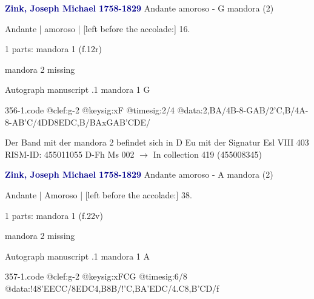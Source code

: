 \documentclass[twocolumn]{book}
\begin{document}
\newline \par \vspace{7pt} \textcolor{darkblue}{\textbf{Zink, Joseph Michael  1758-1829}}
\newline Andante amoroso - G
\newline mandora (2)
\newline \begin{itshape}[f.12r, at left:] Andante | amoroso | [left before the accolade:] 16.\end{itshape} 
\newline \textcolor{darkblue}{}  1 parts: mandora 1  (f.12r)
\newline \begin{small} mandora 2 missing\end{small} 
\newline Autograph manuscript
.1  mandora 1  G  
\begin{filecontents*}{356-1.code}
@clef:g-2
@keysig:xF
@timesig:2/4
@data:2,BA/4B-8-GAB/2'C,B/4A-8-A{B'C}/4DD8EDC,B/BAxGA{B'C}DE/
\end{filecontents*}
\newline
%

\newline Der Band mit der mandora 2 befindet sich in D Eu mit der Signatur Esl VIII 403
\newline RISM-ID: 455011055
\newline D-Fh  Ms 002
\newline $\rightarrow$ In collection 419 (455008345)
      
\newline \par \vspace{7pt} \textcolor{darkblue}{\textbf{Zink, Joseph Michael  1758-1829}}
\newline Andante amoroso - A
\newline mandora (2)
\newline \begin{itshape}[f.22v, at left:] Andante | Amoroso | [left before the accolade:] 38.\end{itshape} 
\newline \textcolor{darkblue}{}  1 parts: mandora 1  (f.22v)
\newline \begin{small} mandora 2 missing\end{small} 
\newline Autograph manuscript
.1  mandora 1  A  
\begin{filecontents*}{357-1.code}
@clef:g-2
@keysig:xFCG
@timesig:6/8
@data:!48'EECC/8EDC4,B8B/!{'C,B}A'EDC/4.C8,B'CD/f
\end{filecontents*}
\newline
%
\end{document}
